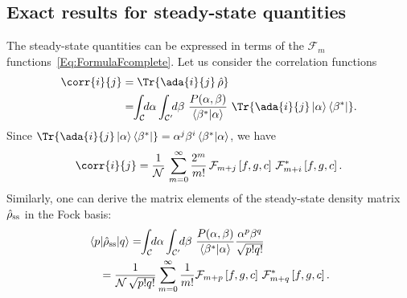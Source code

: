 \subsection{Exact results for steady-state quantities}\label{subsec:ssvalues}

The steady-state quantities can be expressed in terms of the ${\mathcal{F}}_m$ functions~\eqref{Eq:FormulaFcomplete}.
Let us consider the correlation functions
\begin{align}\label{Eq:CorrijFormal}
\corr{i}{j}&=\Tr{\ada{i}{j}\,\hat{\rho}}
\nonumber\\&=
\!\!\int_\mathcal{C}\!\!d\alpha \int_{\mathcal{C}'}\!\!d\beta\,\,
\frac{P(\alpha,\beta)}{\braket{\beta^*|\alpha}}\,\,
\Tr{\ada{i}{j}\ket{\alpha}\bra{\beta^*}}.
\end{align}
Since $\Tr{\ada{i}{j} \ket{\alpha}\bra{\beta^*}}=\alpha^j\beta^i\braket{\beta^*|\alpha}$, we have
\begin{equation}
\label{Eq:CorrijGeneral}
\corr{i}{j}=\frac{1}{{\mathcal{N}}}\,\sum_{m=0}^{\infty} \frac{2^m}{m!}\, {\mathcal{F}}_{m+j}\left[f,g,c\right]\, {\mathcal{F}}_{m+i}^*\left[f,g,c\right].
\end{equation}
Similarly, one can derive the matrix elements of the steady-state density matrix $\hat{\rho}_{\rm ss}$ in the Fock basis:
\begin{align}\label{Eq:RhopqGeneral}
&\braket{p|\hat{\rho}_{\rm ss}|q}=
\!\!\int_\mathcal{C}\!\!d\alpha \int_{\mathcal{C}'}\!\!d\beta\,\,
\frac{P(\alpha,\beta)}{\braket{\beta^*|\alpha}}
\frac{\alpha^p\beta^q}{\sqrt{p!q!}}
\nonumber\\
&\quad=\frac{1}{{\mathcal{N}}\,\sqrt{p!q!}} \sum_{m=0}^{\infty} \frac{1}{m!}
{\mathcal{F}}_{m+p}\left[f,g,c\right]\, {\mathcal{F}}_{m+q}^*\left[f,g,c\right].
\end{align}

